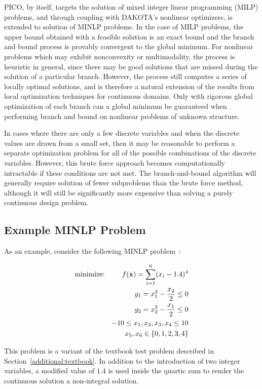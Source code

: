 PICO, by itself, targets the solution of mixed integer linear
programming (MILP) problems, and through coupling with DAKOTA's
nonlinear optimizers, is extended to solution of MINLP problems. In
the case of MILP problems, the upper bound obtained with a feasible
solution is an exact bound and the branch and bound process is
provably convergent to the global minimum. For nonlinear problems
which may exhibit nonconvexity or multimodality, the process is
heuristic in general, since there may be good solutions that are
missed during the solution of a particular branch. However, the
process still computes a series of locally optimal solutions, and is
therefore a natural extension of the results from local optimization
techniques for continuous domains. Only with rigorous global
optimization of each branch can a global minimum be guaranteed when
performing branch and bound on nonlinear problems of unknown
structure.

In cases where there are only a few discrete variables and when the
discrete values are drawn from a small set, then it may be reasonable
to perform a separate optimization problem for all of the possible
combinations of the discrete variables. However, this brute force
approach becomes computationally intractable if these conditions are
not met. The branch-and-bound algorithm will generally require
solution of fewer subproblems than the brute force method, although it
will still be significantly more expensive than solving a purely
continuous design problem.

\subsection{Example MINLP Problem}\label{strat:minlp:example}

As an example, consider the following MINLP problem~\cite{Eld99}:

\begin{eqnarray}
  \hbox{minimize:} & &
  f(\mathbf{x})=\sum_{i=1}^{6}(x_{i}-1.4)^{4}\nonumber\\
  & & g_{1}=x_{1}^{2}-\frac{x_{2}}{2} \leq 0\nonumber\\
  & & g_{2}=x_{2}^{2}-\frac{x_{1}}{2} \leq 0\label{strat:equation02}\\
  & & -10 \leq x_{1},x_{2},x_{3},x_{4} \leq 10\nonumber\\
  & & x_{5},x_{6} \in \{0,1,2,3,4\}\nonumber
\end{eqnarray}

This problem is a variant of the textbook test problem described in
Section~\ref{additional:textbook}. In addition to the introduction of
two integer variables, a modified value of $1.4$ is used inside the
quartic sum to render the continuous solution a non-integral solution.

